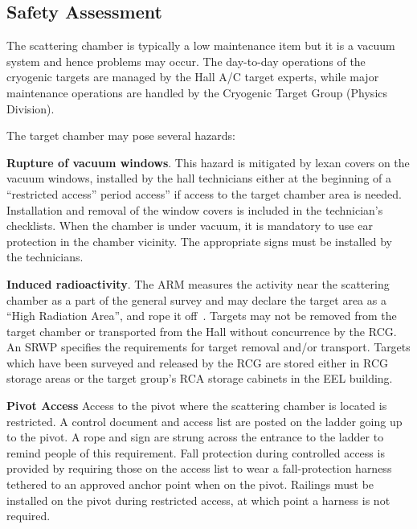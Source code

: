 {%
\begin{safetyen}{0}{0}
\subsection{Safety Assessment}


The scattering chamber is typically a low maintenance item but it is a
vacuum system and hence problems may occur. The day-to-day operations
of the cryogenic targets are managed by the Hall A/C target experts,
while major maintenance operations are handled by the Cryogenic Target
Group (Physics Division).

The target chamber may pose several hazards:

\begin{list}{.~}{\setlength{\itemsep}{-0.15cm}}
  \item {\bf Rupture of vacuum windows}. This hazard is mitigated by
    lexan covers on the vacuum windows, installed by the hall
    technicians either at the beginning of a ``restricted access''
    period
    access'' if access to the target chamber area is needed.
    Installation and removal of the window covers is included in the
    technician's checklists.  When the chamber is under vacuum, it is
    mandatory to use ear protection in the chamber vicinity. The
    appropriate signs must be installed by the technicians.

  \item {\bf Induced radioactivity}. The ARM measures the activity
    near the scattering chamber as a part of the general survey and
    may declare the target area as a ``High Radiation Area'', and rope
    it off~\cite{RWIcebaf}.  Targets may not be removed from the
    target chamber or transported from the Hall without concurrence by
    the RCG. An SRWP specifies the requirements for target removal
    and/or transport. Targets which have been surveyed and released by
    the RCG are stored either in RCG storage areas or the target
    group's RCA storage cabinets in the EEL building.
        
\item {\bf Pivot Access} Access to the pivot where the scattering
  chamber is located is restricted. A control document and access list
  are posted on the ladder going up to the pivot. A rope and sign are
  strung across the entrance to the ladder to remind people of this
  requirement. Fall protection during controlled access is provided by
  requiring those on the access list to wear a fall-protection harness
  tethered to an approved anchor point when on the pivot. Railings
  must be installed on the pivot during restricted access, at which
  point a harness is not required.


\end{list}
\end{safetyen}}
